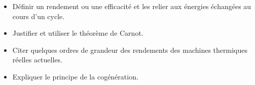 \documentclass[../../main/main.tex]{subfiles}
\begin{document}
\begin{tcn}
\begin{itemize}[label=\rcheck]
		\item Définir un rendement ou une efficacité et les relier aux énergies
		      échangées au cours d'un cycle.

		\item Justifier et utiliser le théorème de Carnot.

		\item Citer quelques ordres de grandeur des rendements des machines
		      thermiques réelles actuelles.

		\item Expliquer le principe de la cogénération.
	\end{itemize}
\end{tcn}

\vspace*{\fill}

\newpage
\end{document}

